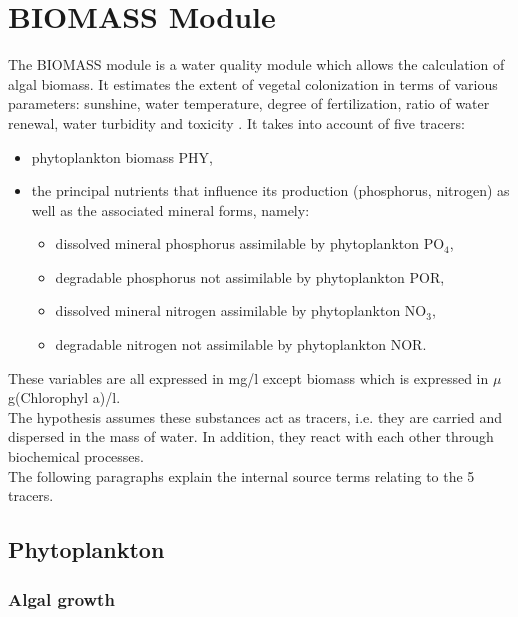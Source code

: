 \chapter{BIOMASS Module}

The BIOMASS module is a water quality module which allows the calculation of algal biomass.
It estimates the extent of vegetal colonization in terms of various parameters:
sunshine, water temperature, degree of fertilization, ratio of water renewal,
water turbidity and toxicity \cite{gosse_biomass_1983}.
It takes into account of five tracers:

\begin{itemize}
\item phytoplankton biomass PHY,
\item the principal nutrients that influence its production (phosphorus, nitrogen)
  as well as the associated mineral forms, namely:

\begin{itemize}
\item dissolved mineral phosphorus assimilable by phytoplankton PO$_4$,
\item degradable phosphorus not assimilable by phytoplankton POR,
\item dissolved mineral nitrogen assimilable by phytoplankton NO$_3$,
\item degradable nitrogen not assimilable by phytoplankton NOR.
\end{itemize}
\end{itemize}

These variables are all expressed in mg/l except biomass which is expressed in $\mu$g(Chlorophyl a)/l.\\

The hypothesis assumes these substances act as tracers,
i.e. they are carried and dispersed in the mass of water.
In addition, they react with each other through biochemical processes.\\

The following paragraphs explain the internal source terms relating to the 5 tracers.

\section{Phytoplankton}

\subsection{Algal growth}

